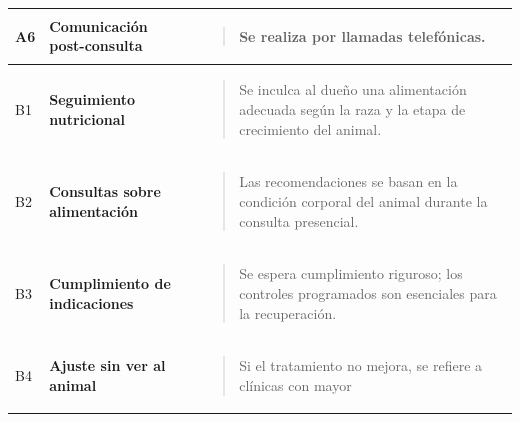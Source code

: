 \documentclass[
]{article}
\newcounter{none} %
\begin{document}
{\def\LTcaptype{none} %
\begin{longtable}[]{@{}
  >{\centering\arraybackslash}p{}
  >{\raggedright\arraybackslash}p{}
  >{\raggedright\arraybackslash}p{}@{}}
\toprule\noalign{}
\begin{minipage}[b]{\linewidth}\centering
A6
\end{minipage} & \begin{minipage}[b]{\linewidth}\raggedright
\textbf{Comunicación post-consulta}
\end{minipage} & \begin{minipage}[b]{\linewidth}\raggedright
\begin{quote}
Se realiza por llamadas telefónicas.
\end{quote}
\end{minipage} \\
\midrule\noalign{}
\endhead
\bottomrule\noalign{}
\endlastfoot
B1 & \textbf{Seguimiento nutricional} &
\begin{minipage}[t]{\linewidth}\raggedright
\begin{quote}
Se inculca al dueño una alimentación adecuada según la raza y la etapa
de crecimiento del animal.
\end{quote}
\end{minipage} \\
B2 & \textbf{Consultas sobre alimentación} &
\begin{minipage}[t]{\linewidth}\raggedright
\begin{quote}
Las recomendaciones se basan en la condición corporal del animal durante
la consulta presencial.
\end{quote}
\end{minipage} \\
B3 & \textbf{Cumplimiento de indicaciones} &
\begin{minipage}[t]{\linewidth}\raggedright
\begin{quote}
Se espera cumplimiento riguroso; los controles programados son
esenciales para la recuperación.
\end{quote}
\end{minipage} \\
B4 & \textbf{Ajuste sin ver al animal} &
\begin{minipage}[t]{\linewidth}\raggedright
\begin{quote}
Si el tratamiento no mejora, se refiere a clínicas con mayor

\end{quote}
\end{minipage}
\end{longtable}}
\end{document}
